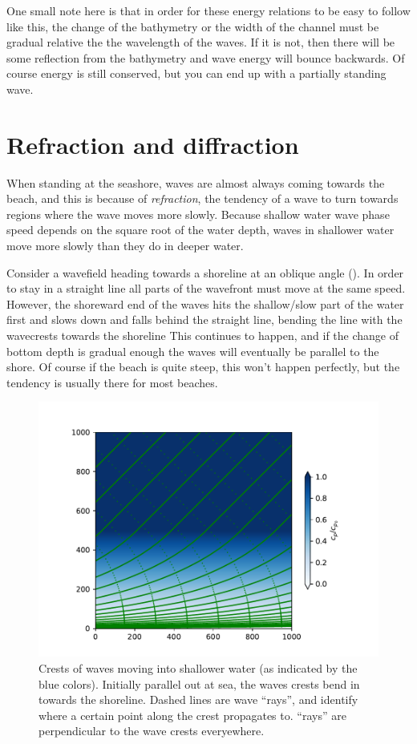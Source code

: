 One small note here is that in order for these energy relations to be easy to follow like this, the change of the bathymetry or the width of the channel must be gradual relative the the wavelength of the waves.  If it is not, then there will be some reflection from the bathymetry and wave energy will bounce backwards. Of course energy is still conserved, but you can end up with a partially standing wave.  


\section{Refraction and diffraction}

When standing at the seashore, waves are almost always coming towards the beach, and this is because of \emph{refraction}, the tendency of a wave to turn towards regions where the wave moves more slowly.  Because shallow water wave phase speed depends on the square root of the water depth, waves in shallower water move more slowly than they do in deeper water.  

Consider a wavefield heading towards a shoreline at an oblique angle ().  In order to stay in a straight line all parts of the wavefront must move at the same speed.  
However, the shoreward end of the waves hits the shallow/slow part of the water first and slows down and falls behind the straight line, bending the line with the wavecrests towards the shoreline  This continues to happen, and if the change of bottom depth is gradual enough the waves will eventually be parallel to the shore. Of course if the beach is quite steep, this won't happen perfectly, but the tendency is usually there for most beaches.  

\begin{figure}[hbt]
  \begin{center}
    \includegraphics{figs/Waves/RaytraceStraight}
    \caption{Crests of waves moving into shallower water (as indicated by the blue colors). Initially parallel out at sea, the waves crests bend in towards the shoreline.  Dashed lines are wave ``rays'', and identify where  a certain point along the crest propagates to.  ``rays'' are perpendicular to the wave crests everyewhere. }
    \label{fig:RaytraceStraight}  
  \end{center}
\end{figure}



